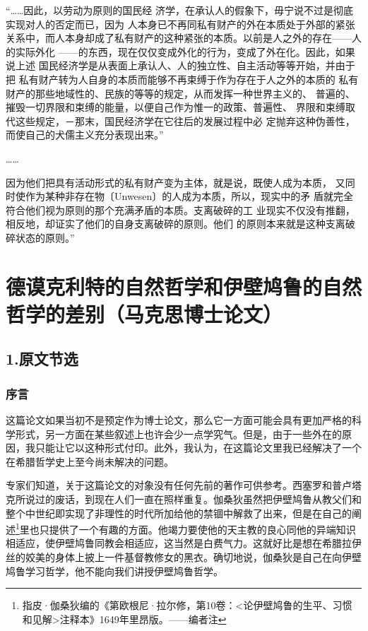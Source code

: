 \documentclass[a4paper,twoside,12pt,AutoFakeBold]{ctexart}
\begin{document}
\begin{fangsong}
“……因此，以劳动为原则的国民经
济学，在承认人的假象下，毋宁说不过是彻底实现对人的否定而已，因为
人本身已不再同私有财产的外在本质处于外部的紧张关系中，而人本身却成了私有财产的这种紧张的本质。以前是人之外的存在——人的实际外化
——的东西，现在仅仅变成外化的行为，变成了外在化。因此，如果说上述
国民经济学是从表面上承认人、人的独立性、自主活动等等开始，并由于把
私有财产转为人自身的本质而能够不再束缚于作为存在于人之外的本质的
私有财产的那些地域性的、民族的等等的规定，从而发挥一种世界主义的、
普遍的、摧毁一切界限和束缚的能量，以便自己作为惟一的政策、普遍性、
界限和束缚取代这些规定，－那末，国民经济学在它往后的发展过程中必
定抛弃这种伪善性，而使自己的犬儒主义充分表现出来。”

……

因为他们把具有活动形式的私有财产变为主体，就是说，既使人成为本质，
又同时使作为某种非存在物〔Unwesen〕的人成为本质，所以，现实中的矛
盾就完全符合他们视为原则的那个充满矛盾的本质。支离破碎的工
业现实不仅没有推翻，相反地，却证实了他们的自身支离破碎的原则。他们
的原则本来就是这种支离破碎状态的原则。”
\end{fangsong}



\section{德谟克利特的自然哲学和伊壁鸠鲁的自然哲学的差别（马克思博士论文）}

\subsection{1.原文节选}
\subsubsection{序言}
这篇论文如果当初不是预定作为博士论文，那么它一方面可能会具有更加严格的科学形式，另一方面在某些叙述上也许会少一点学究气。但是，由于一些外在的原因，我只能让它以这种形式付印。此外，我认为，在这篇论文里我已经解决了一个在希腊哲学史上至今尚未解决的问题。

专家们知道，关于这篇论文的对象没有任何先前的著作可供参考。西塞罗和普卢塔克所说过的废话，到现在人们一直在照样重复。伽桑狄虽然把伊壁鸠鲁从教父们和整个中世纪即实现了非理性的时代所加给他的禁锢中解救了出来，但是在自己的阐述\footnote{指皮·伽桑狄编的《第欧根尼·拉尔修，第10卷：<论伊壁鸠鲁的生平、习惯和见解>注释本》1649年里昂版。——编者注}里也只提供了一个有趣的方面。他竭力要使他的天主教的良心同他的异端知识相适应，使伊壁鸠鲁同教会相适应，这当然是白费气力。这就好比是想在希腊拉伊丝的姣美的身体上披上一件基督教修女的黑衣。确切地说，伽桑狄是自己在向伊壁鸠鲁学习哲学，他不能向我们讲授伊壁鸠鲁哲学。
\end{document}
